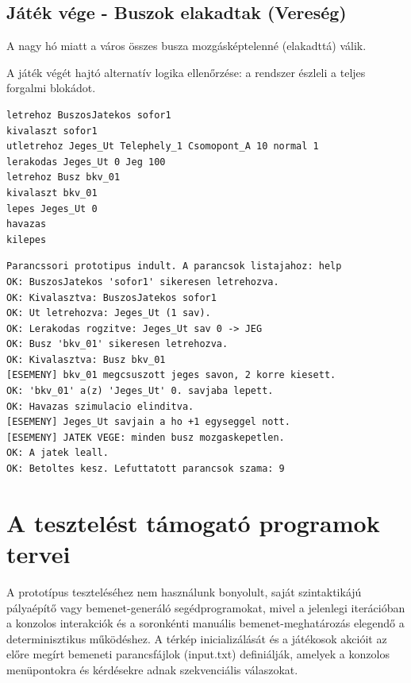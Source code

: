 \subsection{Játék vége - Buszok elakadtak (Vereség)}
\begin{test-case-description}
    A nagy hó miatt a város összes busza mozgásképtelenné (elakadttá) válik.
\end{test-case-description}
\begin{test-case-function}
    A játék végét hajtó alternatív logika ellenőrzése: a rendszer észleli a teljes forgalmi blokádot.
\end{test-case-function}
\begin{test-case-input}
\begin{verbatim}
letrehoz BuszosJatekos sofor1
kivalaszt sofor1
utletrehoz Jeges_Ut Telephely_1 Csomopont_A 10 normal 1
lerakodas Jeges_Ut 0 Jeg 100
letrehoz Busz bkv_01
kivalaszt bkv_01
lepes Jeges_Ut 0
havazas
kilepes
\end{verbatim}
\end{test-case-input}
\begin{test-case-output}
\begin{verbatim}
Parancssori prototipus indult. A parancsok listajahoz: help
OK: BuszosJatekos 'sofor1' sikeresen letrehozva.
OK: Kivalasztva: BuszosJatekos sofor1
OK: Ut letrehozva: Jeges_Ut (1 sav).
OK: Lerakodas rogzitve: Jeges_Ut sav 0 -> JEG
OK: Busz 'bkv_01' sikeresen letrehozva.
OK: Kivalasztva: Busz bkv_01
[ESEMENY] bkv_01 megcsuszott jeges savon, 2 korre kiesett.
OK: 'bkv_01' a(z) 'Jeges_Ut' 0. savjaba lepett.
OK: Havazas szimulacio elinditva.
[ESEMENY] Jeges_Ut savjain a ho +1 egyseggel nott.
[ESEMENY] JATEK VEGE: minden busz mozgaskepetlen.
OK: A jatek leall.
OK: Betoltes kesz. Lefuttatott parancsok szama: 9
\end{verbatim}
\end{test-case-output}

\section{A tesztelést támogató programok tervei}
A prototípus teszteléséhez nem használunk bonyolult, saját szintaktikájú pályaépítő vagy bemenet-generáló segédprogramokat, mivel a jelenlegi iterációban a konzolos interakciók és a soronkénti manuális bemenet-meghatározás elegendő a determinisztikus működéshez. A térkép inicializálását és a játékosok akcióit az előre megírt bemeneti parancsfájlok (input.txt) definiálják, amelyek a konzolos menüpontokra és kérdésekre adnak szekvenciális válaszokat.

